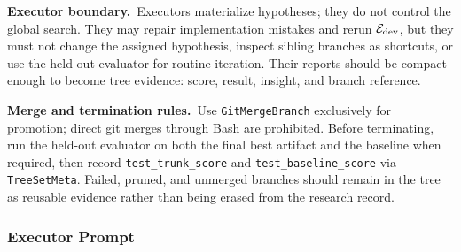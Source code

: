 \begin{promptbox}[title=\textbf{Coordinator Prompt}]
\smallskip
\noindent\textbf{Executor boundary.}~Executors materialize hypotheses; they do
not control the global search. They may repair implementation mistakes and rerun
$\mathcal{E}_{\mathrm{dev}}$, but they must not change the assigned hypothesis, inspect sibling
branches as shortcuts, or use the held-out evaluator for routine iteration.
Their reports should be compact enough to become tree evidence: score, result,
insight, and branch reference.

\smallskip
\noindent\textbf{Merge and termination rules.}~Use \texttt{GitMergeBranch}
exclusively for promotion; direct git merges through Bash are prohibited. Before
terminating, run the held-out evaluator on both the final best artifact and the
baseline when required, then record \texttt{test\_trunk\_score} and
\texttt{test\_baseline\_score} via \texttt{TreeSetMeta}. Failed, pruned, and
unmerged branches should remain in the tree as reusable evidence rather than
being erased from the research record.
\end{promptbox}

\subsubsection{Executor Prompt}
\label{app:sub-agent-prompt}

